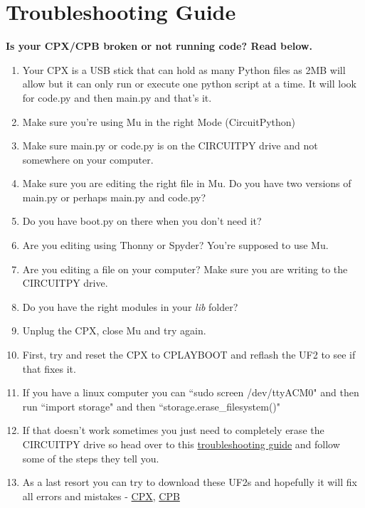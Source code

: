 \newpage

\section{Troubleshooting Guide}

{\bf Is your CPX/CPB broken or not running code? Read below.}

\begin{enumerate}[itemsep=-5pt]
  \item Your CPX is a USB stick that can hold as many Python files as 2MB will allow but it can only run or execute one python script at a time. It will look for code.py and then main.py and that's it. 
  \item Make sure you're using Mu in the right Mode (CircuitPython)
  \item Make sure main.py or code.py is on the CIRCUITPY drive and not somewhere on your computer.
  \item Make sure you are editing the right file in Mu. Do you have two versions of main.py or perhaps main.py and code.py?
  \item Do you have boot.py on there when you don't need it?
  \item Are you editing using Thonny or Spyder? You're supposed to use Mu. 
  \item Are you editing a file on your computer? Make sure you are
    writing to the CIRCUITPY drive.
  \item Do you have the right modules in your {\it lib} folder?
  \item Unplug the CPX, close Mu and try again.
  \item First, try and reset the CPX to CPLAYBOOT and reflash the UF2 to see if that fixes it.
  \item If you have a linux computer you can ``sudo screen /dev/ttyACM0" and then run ``import storage" and then ``storage.erase\_filesystem()"
  \item If that doesn’t work sometimes you just need to completely erase the CIRCUITPY drive so head over to this \href{https://learn.adafruit.com/adafruit-circuit-playground-express/troubleshooting}{troubleshooting guide} and follow some of the steps they tell you.
  \item As a last resort you can try to download these UF2s and
    hopefully it will fix all errors and mistakes -
    \href{https://cdn-learn.adafruit.com/assets/assets/000/048/745/original/flash_erase_express.ino.circuitplay.uf2?1512152080}{CPX}, \href{https://cdn-learn.adafruit.com/assets/assets/000/082/950/original/CP_Bluefruit_QSPI_Erase.UF2?1572026649}{CPB}

\end{enumerate}
